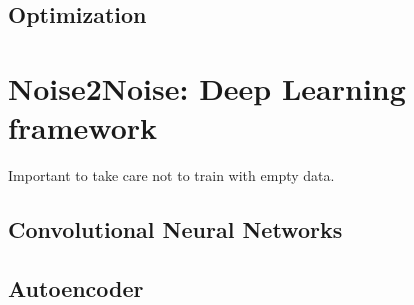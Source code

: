 \subsection{Optimization}
\section{Noise2Noise: Deep Learning framework}
Important to take care not to train with empty data. 
\subsection{Convolutional Neural Networks}
\subsection{Autoencoder}